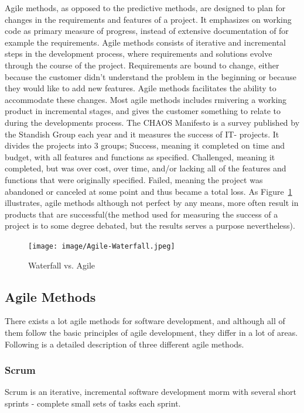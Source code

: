 Agile methods, as opposed to the predictive methods, are designed to plan for changes in the requirements and features of a project. It emphasizes on working code as primary measure of progress, instead of extensive documentation of for example the requirements. Agile methods consists of iterative and incremental steps in the development process, where requirements and solutions evolve through the course of the project. Requirements are bound to change, either because the customer didn't understand the problem in the beginning or because they would like to add new features. Agile methods facilitates the ability to accommodate these changes. Most agile methods includes rmivering a working product in incremental stages, and gives the customer something to relate to during the developments process. The CHAOS Manifesto is a survey published by the Standish Group each year and it measures the success of IT- projects. It divides the projects into 3 groups; Success, meaning it completed on time and budget, with all features and functions as specified. Challenged, meaning it  completed, but was over cost, over time, and/or lacking all of the features and functions that were originally specified. Failed, meaning the project was abandoned or canceled at some point and thus became a total loss. As Figure~\ref{figure:devchart} illustrates, agile methods although not perfect by any means, more often result in products that are successful(the method used for measuring the success of a project is to some degree debated, but the results serves a purpose nevertheless).

\begin{figure}
\centering
\texttt{[image: image/Agile-Waterfall.jpeg]}
\caption{Waterfall vs. Agile}
\label{figure:devchart}
\end{figure}

\subsection{Agile Methods}
There exists a lot agile methods for software development, and although all of them follow the basic principles of agile development, they differ in a lot of areas. Following is a detailed description of three different agile methods.

\subsubsection{Scrum}
Scrum is an iterative, incremental software development morm with several short sprints - complete small sets of tasks each sprint.

